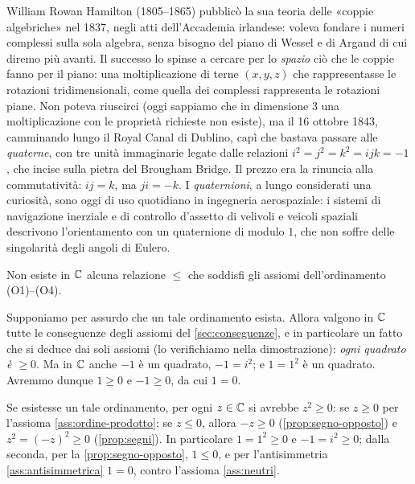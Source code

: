 \begin{notastorica}
William Rowan Hamilton (1805--1865) pubblicò la sua teoria delle «coppie algebriche» nel
1837, negli atti dell'Accademia irlandese: voleva fondare i numeri complessi sulla sola
algebra, senza bisogno del piano di Wessel e di Argand di cui diremo più avanti. Il
successo lo spinse a cercare per lo \emph{spazio} ciò che le coppie fanno per il piano:
una moltiplicazione di terne $(x,y,z)$ che rappresentasse le rotazioni tridimensionali,
come quella dei complessi rappresenta le rotazioni piane. Non poteva riuscirci (oggi
sappiamo che in dimensione $3$ una moltiplicazione con le proprietà richieste non esiste),
ma il 16 ottobre 1843, camminando lungo il Royal Canal di Dublino, capì che bastava
passare alle \emph{quaterne}, con tre unità immaginarie legate dalle relazioni
$i^{2}=j^{2}=k^{2}=ijk=-1$, che incise sulla pietra del Brougham Bridge. Il prezzo era la
rinuncia alla commutatività: $ij=k$, ma $ji=-k$. I \emph{quaternioni}, a lungo considerati
una curiosità, sono oggi di uso quotidiano in ingegneria aerospaziale: i sistemi di
navigazione inerziale e di controllo d'assetto di velivoli e veicoli spaziali descrivono
l'orientamento con un quaternione di modulo $1$, che non soffre delle singolarità degli
angoli di Eulero.
\end{notastorica}

\begin{proposizione}\label{prop:C-non-ordinabile}
Non esiste in $\mathbb{C}$ alcuna relazione $\le$ che soddisfi gli assiomi dell'ordinamento
(O1)--(O4).
\end{proposizione}

\begin{schema}
\end{schema}

\begin{strategia}
Supponiamo per assurdo che un tale ordinamento esista. Allora valgono in $\mathbb{C}$ tutte le
conseguenze degli assiomi del \cref{sec:conseguenze}, e in particolare un fatto che si
deduce dai soli assiomi (lo verifichiamo nella dimostrazione): \emph{ogni quadrato è $\ge0$}.
Ma in $\mathbb{C}$ anche $-1$ è un quadrato, $-1=i^{2}$; e $1=1^{2}$ è un quadrato. Avremmo
dunque $1\ge0$ e $-1\ge0$, da cui $1=0$.
\end{strategia}

\begin{dimostrazione}
Se esistesse un tale ordinamento, per ogni $z\in\mathbb{C}$ si avrebbe $z^{2}\ge0$: se $z\ge0$
per l'assioma \ref{ass:ordine-prodotto}; se $z\le0$, allora $-z\ge0$
(\cref{prop:segno-opposto}) e $z^{2}=(-z)^{2}\ge0$ (\cref{prop:segni}). In particolare
$1=1^{2}\ge0$ e $-1=i^{2}\ge0$; dalla seconda, per la \cref{prop:segno-opposto},
$1\le0$, e per l'antisimmetria \ref{ass:antisimmetrica} $1=0$, contro l'assioma
\ref{ass:neutri}.
\end{dimostrazione}

